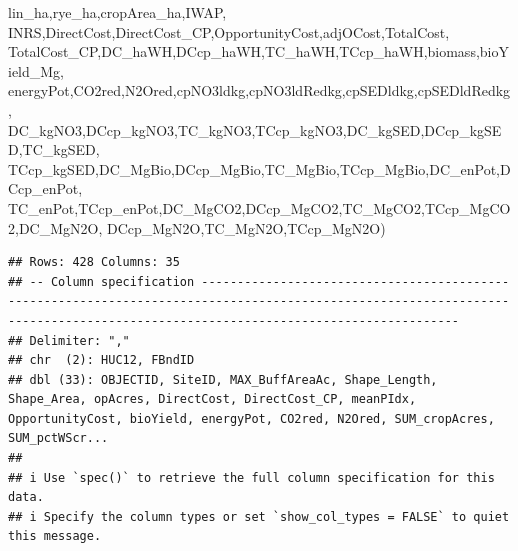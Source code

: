 \documentclass[
]{article}
\newenvironment{Shaded}{\begin{snugshade}}{\end{snugshade}}
\newcommand{\NormalTok}[1]{#1}
\begin{document}
\begin{Shaded}
\begin{Highlighting}[]
\NormalTok{         lin\_ha,rye\_ha,cropArea\_ha,IWAP,}
\NormalTok{         INRS,DirectCost,DirectCost\_CP,OpportunityCost,adjOCost,TotalCost,}
\NormalTok{         TotalCost\_CP,DC\_haWH,DCcp\_haWH,TC\_haWH,TCcp\_haWH,biomass,bioYield\_Mg,}
\NormalTok{         energyPot,CO2red,N2Ored,cpNO3ldkg,cpNO3ldRedkg,cpSEDldkg,cpSEDldRedkg,}
\NormalTok{         DC\_kgNO3,DCcp\_kgNO3,TC\_kgNO3,TCcp\_kgNO3,DC\_kgSED,DCcp\_kgSED,TC\_kgSED,}
\NormalTok{         TCcp\_kgSED,DC\_MgBio,DCcp\_MgBio,TC\_MgBio,TCcp\_MgBio,DC\_enPot,DCcp\_enPot,}
\NormalTok{         TC\_enPot,TCcp\_enPot,DC\_MgCO2,DCcp\_MgCO2,TC\_MgCO2,TCcp\_MgCO2,DC\_MgN2O,}
\NormalTok{         DCcp\_MgN2O,TC\_MgN2O,TCcp\_MgN2O)}
\end{Highlighting}
\end{Shaded}

\begin{verbatim}
## Rows: 428 Columns: 35
## -- Column specification --------------------------------------------------------------------------------------------------------------------------------------------------------------------------------
## Delimiter: ","
## chr  (2): HUC12, FBndID
## dbl (33): OBJECTID, SiteID, MAX_BuffAreaAc, Shape_Length, Shape_Area, opAcres, DirectCost, DirectCost_CP, meanPIdx, OpportunityCost, bioYield, energyPot, CO2red, N2Ored, SUM_cropAcres, SUM_pctWScr...
## 
## i Use `spec()` to retrieve the full column specification for this data.
## i Specify the column types or set `show_col_types = FALSE` to quiet this message.
\end{verbatim}
\end{document}
